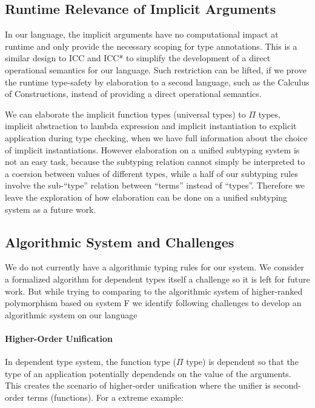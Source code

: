 \subsection{Runtime Relevance of Implicit Arguments}

In our language, the implicit arguments have no computational impact at runtime
and only provide the necessary scoping for type annotations. This is
a similar design to ICC\cite{miquel2001implicit} and
ICC*\cite{barras2008implicit} to simplify the development of a direct
operational semantics for our language. Such restriction can be lifted, if we
prove the runtime type-safety by elaboration to a second language,
such as the Calculus of Constructions\cite{coc},
instead of providing a direct operational semantics.

We can elaborate the implicit function types (universal types) to $\Pi$ types,
implicit abstraction to lambda expression and implicit instantiation to explicit
application during type checking, when we have full information about the
choice of implicit instantiations. However elaboration on a unified subtyping
system is not an easy task, because the subtyping relation cannot simply be interpreted
to a coersion between values of different types, while a half of our subtyping
rules involve the sub-``type'' relation between ``terms'' instead of ``types''.
Therefore we leave the exploration of how elaboration can be done
on a unified subtyping system as a future work.

\subsection{Algorithmic System and Challenges}

We do not currently have a algorithmic typing rules for our system. We
consider a formalized algorithm for dependent types itself a challenge so it
is left for future work. But while trying to comparing to the algorithmic system
of higher-ranked polymorphism based on system F
\cite{dunfield2013complete,zhao19mechanical}
we identify following challenges to develop an algorithmic system on our language

\paragraph{Higher-Order Unification}

In dependent type system, the function type ($\Pi$ type) is dependent so that
the type of an application potentially dependends on the value of the arguments.
This creates the scenario of higher-order unification where the unifier is
second-order terms (functions). For a extreme example:


